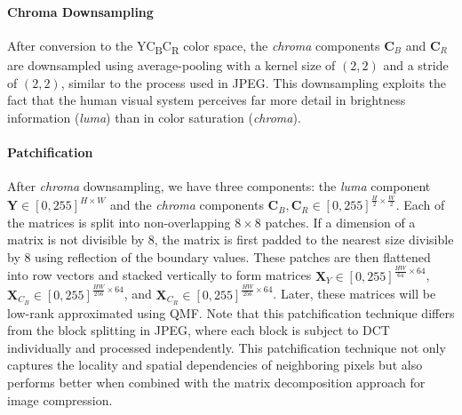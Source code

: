 \paragraph{Chroma Downsampling}
After conversion to the YC\textsubscript{B}C\textsubscript{R} color space, the \emph{chroma} components $\bm{C}_B$ and $\bm{C}_R$ are downsampled using average-pooling with a kernel size of $(2, 2)$ and a stride of $(2, 2)$, similar to the process used in JPEG. This downsampling exploits the fact that the human visual system perceives far more detail in brightness information (\emph{luma}) than in color saturation (\emph{chroma}).

\paragraph{Patchification}
After \emph{chroma} downsampling, we have three components:  the \emph{luma} component $\bm{Y} \in [0, 255]^{H \times W}$ and the \emph{chroma} components $\bm{C}_B, \bm{C}_R \in [0, 255]^{\frac{H}{2} \times \frac{W}{2}}$. Each of the matrices is split into non-overlapping $8 \times 8$ patches. If a dimension of a matrix is not divisible by 8, the matrix is first padded to the nearest size divisible by 8 using reflection of the boundary values. These patches are then flattened into row vectors and stacked vertically to form matrices $\bm{X}_{Y} \in [0, 255]^{\frac{HW}{64} \times 64}$, $\bm{X}_{C_B} \in [0, 255]^{\frac{HW}{256} \times 64}$, and $\bm{X}_{C_R} \in [0, 255]^{\frac{HW}{256} \times 64}$. Later, these matrices will be low-rank approximated using QMF. Note that this patchification technique differs from the block splitting in JPEG, where each block is subject to DCT individually and processed independently. This patchification technique not only captures the locality and spatial dependencies of neighboring pixels but also performs better when combined with the matrix decomposition approach for image compression.

